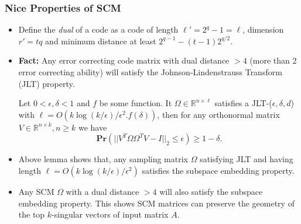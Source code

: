 \documentclass[9pt]{beamer}
\newcommand{\mB}{\mathbb}
\begin{document}
\begin{frame}
\frametitle{Nice Properties of SCM} 
\begin{itemize} 
\item Define the \textit{dual} of a code as a code of length $\ell' = 2^q - 1 = \ell$, dimension $r' = tq$ and minimum distance at least $2^{q-1} - (t - 1)2^{q/2}$.
\vspace{3mm}

\item \textbf{Fact:} Any error correcting code matrix with dual distance $> 4$ (more than 2 error correcting ability) will satisfy the Johnson-Lindenstrauss Transform (JLT) property.
\vspace{3mm}

\begin{lemma}
Let $0< \epsilon, \delta < 1$ and $f$ be some function. It $\Omega \in \mB{R}^{n \times \ell}$ satisfies a JLT-($\epsilon, \delta, d$) with $\ell = O(k \log(k /\epsilon)/\epsilon^2. f(\delta))$, then for any orthonormal matrix $V \in \mB{R}^{n \times k}, n \ge k$ we have 
\[ \textbf{Pr}(|| V^T \Omega \Omega^TV - I||_2 \le \epsilon) \ge 1 - \delta. \]
\end{lemma}
\vspace{3mm}

\item Above lemma shows that, any sampling matrix $\Omega$ satisfying JLT and having length $\ell = O(k \log(k/\epsilon) / \epsilon^2)$ satisfies the subspace embedding property.
\vspace{3mm}

\item Any SCM $\Omega$ with a dual distance $> 4$ will also satisfy the subspace embedding property. This shows SCM matrices can preserve the geometry of the top $k$-singular vectors of input matrix $A$.
\end{itemize}
\end{frame}
\end{document}
